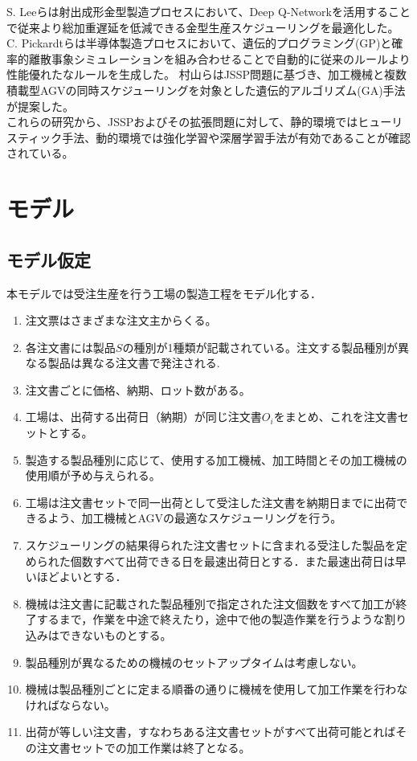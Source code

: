 \documentclass{jarticle}
\begin{document}
S. Leeら\cite{ref6}は射出成形金型製造プロセスにおいて、Deep Q-Networkを活用することで従来より総加重遅延を低減できる金型生産スケジューリングを最適化した。
C. Pickardtら\cite{ref7}は半導体製造プロセスにおいて、遺伝的プログラミング(GP)と確率的離散事象シミュレーションを組み合わせることで自動的に従来のルールより性能優れたなルールを生成した。
村山ら\cite{ref8}はJSSP問題に基づき、加工機械と複数積載型AGVの同時スケジューリングを対象とした遺伝的アルゴリズム(GA)手法が提案した。\\
これらの研究から、JSSPおよびその拡張問題に対して、静的環境ではヒューリスティック手法、動的環境では強化学習や深層学習手法が有効であることが確認されている。

\section{モデル}
\subsection{モデル仮定}
本モデルでは受注生産を行う工場の製造工程をモデル化する．
\begin{enumerate}
    \item 注文票はさまざまな注文主からくる。
    \item 各注文書には製品$S$の種別が1種類が記載されている。注文する製品種別が異なる製品は異なる注文書で発注される.
    \item 注文書ごとに価格、納期、ロット数がある。
    \item 工場は、出荷する出荷日（納期）が同じ注文書$O_{\textit{i}}$をまとめ、これを注文書セットとする。
    \item 製造する製品種別に応じて、使用する加工機械、加工時間とその加工機械の使用順が予め与えられる。
    \item 工場は注文書セットで同一出荷として受注した注文書を納期日までに出荷できるよう、加工機械とAGVの最適なスケジューリングを行う。
    \item スケジューリングの結果得られた注文書セットに含まれる受注した製品を定められた個数すべて出荷できる日を最速出荷日とする．また最速出荷日は早いほどよいとする．
    \item 機械は注文書に記載された製品種別で指定された注文個数をすべて加工が終了するまで，作業を中途で終えたり，途中で他の製造作業を行うような割り込みはできないものとする。
    \item 製品種別が異なるための機械のセットアップタイムは考慮しない。
    \item 機械は製品種別ごとに定まる順番の通りに機械を使用して加工作業を行わなければならない。
    \item 出荷が等しい注文書，すなわちある注文書セットがすべて出荷可能とればその注文書セットでの加工作業は終了となる。
    \end{enumerate}
\end{document}

